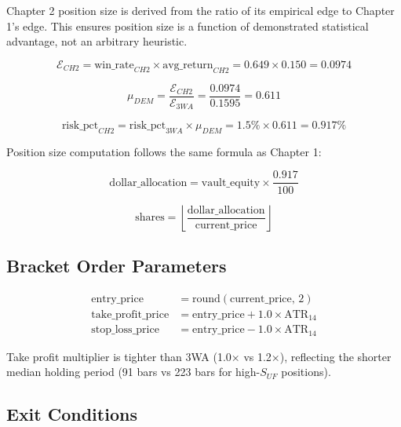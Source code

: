 \documentclass[11pt, a4paper]{article}
\begin{document}
Chapter 2 position size is derived from the ratio of its empirical edge to Chapter 1's
edge. This ensures position size is a function of demonstrated statistical advantage,
not an arbitrary heuristic.

\begin{equation}
  \mathcal{E}_{CH2} = \text{win\_rate}_{CH2} \times \text{avg\_return}_{CH2}
                    = 0.649 \times 0.150 = 0.0974
\end{equation}

\begin{equation}
  \mu_{DEM} = \frac{\mathcal{E}_{CH2}}{\mathcal{E}_{3WA}} = \frac{0.0974}{0.1595} = 0.611
\end{equation}

\begin{equation}
  \text{risk\_pct}_{CH2} = \text{risk\_pct}_{3WA} \times \mu_{DEM}
                         = 1.5\% \times 0.611 = 0.917\%
\end{equation}

Position size computation follows the same formula as Chapter 1:

\begin{equation}
  \text{dollar\_allocation} = \text{vault\_equity} \times \frac{0.917}{100}
\end{equation}

\begin{equation}
  \text{shares} = \left\lfloor \frac{\text{dollar\_allocation}}{\text{current\_price}} \right\rfloor
\end{equation}

\subsection{Bracket Order Parameters}

\begin{align}
  \text{entry\_price}        &= \text{round}(\text{current\_price},\, 2) \\
  \text{take\_profit\_price}  &= \text{entry\_price} + 1.0 \times \text{ATR}_{14} \\
  \text{stop\_loss\_price}    &= \text{entry\_price} - 1.0 \times \text{ATR}_{14}
\end{align}

Take profit multiplier is tighter than 3WA (1.0× vs 1.2×), reflecting the shorter
median holding period (91 bars vs 223 bars for high-$S_{UF}$ positions).

\subsection{Exit Conditions}
\end{document}
